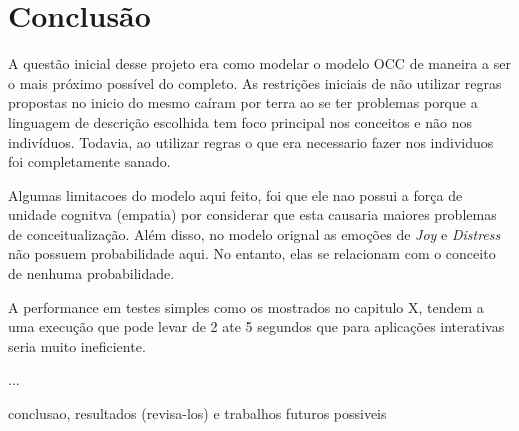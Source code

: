 \chapter{Conclusão} \label{cap:c}

A questão inicial desse projeto era como modelar o modelo OCC
\cite{ortony1988cse} de maneira a ser o mais próximo possível do completo. As
restrições iniciais de não utilizar regras propostas no inicio do mesmo caíram
por terra ao se ter problemas porque a linguagem de descrição escolhida tem
foco principal nos conceitos e não nos indivíduos. Todavia, ao utilizar regras
o que era necessario fazer nos individuos foi completamente sanado.

Algumas limitacoes do modelo aqui feito, foi que ele nao possui a força de
unidade cognitva (empatia) por considerar que esta causaria maiores problemas
de conceitualização. Além disso, no modelo orignal as emoções de \emph{Joy} e
\emph{Distress} não possuem probabilidade aqui. No entanto, elas se relacionam
com o conceito de nenhuma probabilidade.

A performance em testes simples como os mostrados no capitulo X,
tendem a uma execução que pode levar de 2 ate 5 segundos que para aplicações
interativas seria muito ineficiente.

...

conclusao,
resultados (revisa-los)
e trabalhos futuros possiveis

